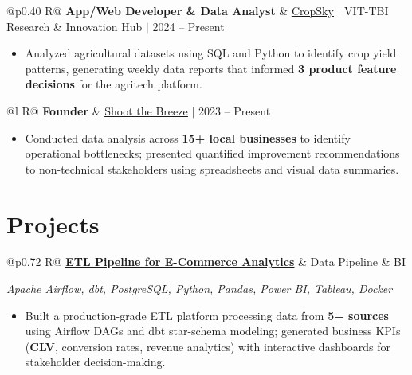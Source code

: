 \documentclass[a4paper,10pt]{article}
\newcommand{\ulink}[2]{\href{#1}{\uline{#2}}}
\newcommand{\subheading}[1]{{\color[HTML]{0A0A0A}\fontsize{12}{14}\selectfont\bfseries #1}}
\newcommand{\techstack}[1]{{\color[HTML]{5C5C5C}\fontsize{10.5}{12.5}\selectfont\itshape #1}}
\newcommand{\meta}[1]{{\color[HTML]{5C5C5C}\fontsize{10.5}{12.5}\selectfont #1}}
\begin{document}
\begin{tabularx}{\linewidth}{@{}p{0.40\linewidth} R@{}}
\subheading{App/Web Developer \& Data Analyst} & \meta{\ulink{https://sites.google.com/view/cropsky/home}{CropSky} $|$ VIT-TBI Research \& Innovation Hub $|$ 2024 -- Present}
\end{tabularx}
\begin{itemize}[nosep, leftmargin=1.5em, itemsep=1pt, topsep=2pt]
  \item {\color[HTML]{0A0A0A}\fontsize{11}{14}\selectfont Analyzed agricultural datasets using SQL and Python to identify crop yield patterns, generating weekly data reports that informed \textbf{3 product feature decisions} for the agritech platform.}
\end{itemize}

\vspace{2pt}

\begin{tabularx}{\linewidth}{@{}l R@{}}
\subheading{Founder} & \meta{\ulink{https://shoot-the-breeze.vercel.app}{Shoot the Breeze} $|$ 2023 -- Present}
\end{tabularx}
\begin{itemize}[nosep, leftmargin=1.5em, itemsep=1pt, topsep=2pt]
  \item {\color[HTML]{0A0A0A}\fontsize{11}{14}\selectfont Conducted data analysis across \textbf{15+ local businesses} to identify operational bottlenecks; presented quantified improvement recommendations to non-technical stakeholders using spreadsheets and visual data summaries.}
\end{itemize}

\vspace{2pt}

\section{Projects}
\vspace{2pt}

\begin{tabularx}{\linewidth}{@{}p{0.72\linewidth} R@{}}
\subheading{\ulink{https://github.com/su-jin1425/ETL-Pipeline-for-E-Commerce-Analytics}{ETL Pipeline for E-Commerce Analytics}} & \meta{Data Pipeline \& BI}
\end{tabularx}
\vspace{1pt}
\techstack{Apache Airflow, dbt, PostgreSQL, Python, Pandas, Power BI, Tableau, Docker}
\begin{itemize}[nosep, leftmargin=1.5em, itemsep=1pt, topsep=2pt]
  \item {\color[HTML]{0A0A0A}\fontsize{11}{14}\selectfont Built a production-grade ETL platform processing data from \textbf{5+ sources} using Airflow DAGs and dbt star-schema modeling; generated business KPIs (\textbf{CLV}, conversion rates, revenue analytics) with interactive dashboards for stakeholder decision-making.}
\end{itemize}
\end{document}
